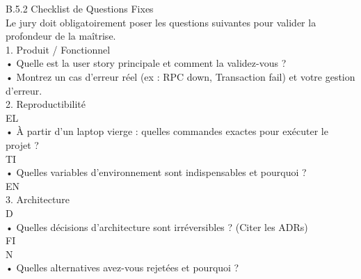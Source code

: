 B.5.2 Checklist de Questions Fixes\\
Le jury doit obligatoirement poser les questions suivantes pour valider la profondeur de la maîtrise.\\
\vspace{0.5em}
1. Produit / Fonctionnel\\
\vspace{0.5em}
• Quelle est la user story principale et comment la validez-vous ?\\
\vspace{0.5em}
• Montrez un cas d’erreur réel (ex : RPC down, Transaction fail) et votre gestion d’erreur.\\
\vspace{0.5em}
2. Reproductibilité\\
\vspace{0.5em}
\vspace{0.5em}
\vspace{0.5em}
\vspace{0.5em}
EL\\
• À partir d’un laptop vierge : quelles commandes exactes pour exécuter le projet ?\\
\vspace{0.5em}
\vspace{0.5em}
\vspace{0.5em}
\vspace{0.5em}
TI\\
• Quelles variables d’environnement sont indispensables et pourquoi ?\\
\vspace{0.5em}
\vspace{0.5em}
\vspace{0.5em}
\vspace{0.5em}
EN\\
3. Architecture\\
\vspace{0.5em}
\vspace{0.5em}
\vspace{0.5em}
\vspace{0.5em}
D\\
• Quelles décisions d’architecture sont irréversibles ? (Citer les ADRs)\\
\vspace{0.5em}
\vspace{0.5em}
\vspace{0.5em}
\vspace{0.5em}
FI\\
N\\
• Quelles alternatives avez-vous rejetées et pourquoi ?\\
